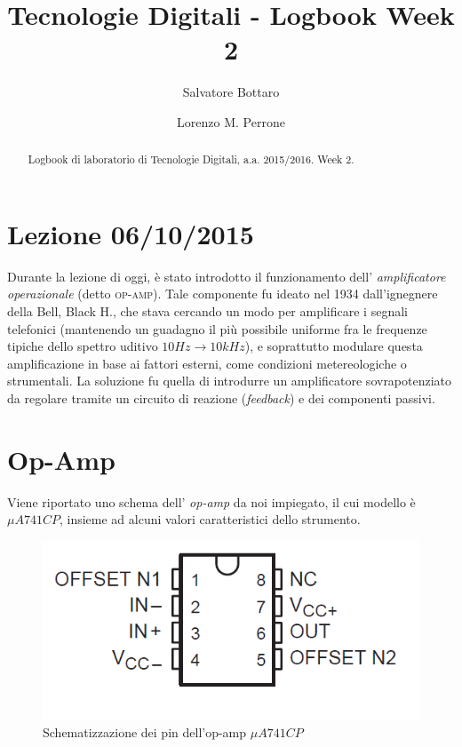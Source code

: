 \documentclass[journal, a4paper]{IEEEtran}
\begin{document}
	\title{Tecnologie Digitali - Logbook Week 2}
	\author[1]{Salvatore Bottaro}
		\author[2]{Lorenzo M. Perrone}
	\maketitle
	
\begin{abstract}
	Logbook di laboratorio di Tecnologie Digitali, a.a. 2015/2016. Week 2.
\end{abstract}

\section{Lezione 06/10/2015}
Durante la lezione di oggi, è stato introdotto il funzionamento dell' \textit{amplificatore operazionale} (detto \textsc{op-amp}). Tale componente fu ideato nel 1934 dall'ignegnere della Bell, Black H., che stava cercando un modo per amplificare i segnali telefonici (mantenendo un guadagno il più possibile uniforme fra le frequenze tipiche dello spettro uditivo $10\si{Hz}\rightarrow 10 \si{kHz} $),  e soprattutto modulare questa amplificazione in base ai fattori esterni, come condizioni metereologiche o strumentali. La soluzione fu quella di introdurre un amplificatore sovrapotenziato da regolare tramite un circuito di reazione (\textit{feedback}) e dei componenti passivi.\\

\section{Op-Amp}
Viene riportato uno schema dell' \textit{op-amp} da noi impiegato, il cui modello è $\mu A 741CP$, insieme ad alcuni valori caratteristici dello strumento.\\

\begin{figure}
\centering
\includegraphics[width=0.7\linewidth]{./opamp-disegno}
\caption{Schematizzazione dei pin dell'op-amp $ \mu A741CP$}
\label{fig:opamp-disegno}
\end{figure}
\end{document}
